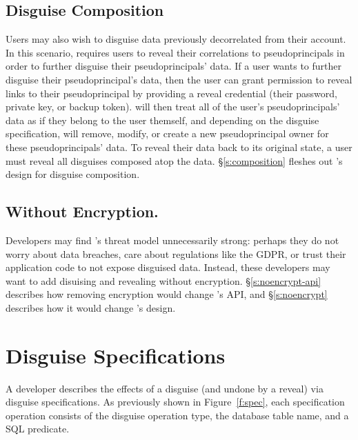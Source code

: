 \subsection{Disguise Composition}
\label{s:semantics:hl:composition}

Users may also wish to disguise data previously decorrelated from their
account. In this scenario, \sys requires users to reveal their correlations to
pseudoprincipals in order to further disguise their pseudoprincipals' data.
%
If a user wants to further disguise their pseudoprincipal's data, then the user
can grant \sys permission to reveal links to their pseudoprincipal by providing
a reveal credential (their password, private key, or backup token). 
%
\sys will then treat all of the user's pseudoprincipals' data as if they belong
to the user themself, and depending on the disguise specification, will remove,
modify, or create a new pseudoprincipal owner for these pseudoprincipals' data.
%
To reveal their data back to its original state, a user must reveal all
disguises composed atop the data.
%
\S\ref{s:composition} fleshes out \sys's design for disguise composition.

\subsection{\sys Without Encryption.}
\label{s:semantics:noencrypt}

Developers may find \sys's threat model unnecessarily strong: perhaps they do
not worry about data breaches, care about regulations like the GDPR, or trust
their application code to not expose disguised data. Instead, these developers
may want to add disuising and revealing without encryption.
%
\S\ref{s:noencrypt-api} describes how removing encryption would change \sys's
API, and \S\ref{s:noencrypt} describes how it would change
\sys's design.

\section{Disguise Specifications}
\label{s:semantics:spec}

%
A developer describes the effects of a disguise (and undone by a
reveal) via disguise specifications.  As previously shown in
Figure~\ref{f:spec}, each specification operation consists of the disguise
operation type, the database table name, 
and a SQL  predicate.

